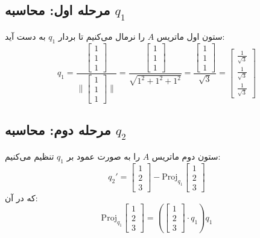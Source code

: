 \begin{solution}
	\subsection*{مرحله اول: محاسبه \( q_1 \)}
	ستون اول ماتریس \( A \) را نرمال می‌کنیم تا بردار \( q_1 \) به دست آید:
	\[
	q_1 = \frac{\begin{bmatrix} 1 \\ 1 \\ 1 \end{bmatrix}}{\|\begin{bmatrix} 1 \\ 1 \\ 1 \end{bmatrix}\|} = \frac{\begin{bmatrix} 1 \\ 1 \\ 1 \end{bmatrix}}{\sqrt{1^2 + 1^2 + 1^2}} = \frac{\begin{bmatrix} 1 \\ 1 \\ 1 \end{bmatrix}}{\sqrt{3}} = \begin{bmatrix} \frac{1}{\sqrt{3}} \\ \frac{1}{\sqrt{3}} \\ \frac{1}{\sqrt{3}} \end{bmatrix}
	\]
	
	\subsection*{مرحله دوم: محاسبه \( q_2 \)}
	ستون دوم ماتریس \( A \) را به صورت عمود بر \( q_1 \) تنظیم می‌کنیم:
	\[
	q_2' = \begin{bmatrix} 1 \\ 2 \\ 3 \end{bmatrix} - \text{Proj}_{q_1}\begin{bmatrix} 1 \\ 2 \\ 3 \end{bmatrix}
	\]
	که در آن:
	\[
	\text{Proj}_{q_1}\begin{bmatrix} 1 \\ 2 \\ 3 \end{bmatrix} = \left(\begin{bmatrix} 1 \\ 2 \\ 3 \end{bmatrix} \cdot q_1 \right) q_1
	\]
	

\end{solution}
